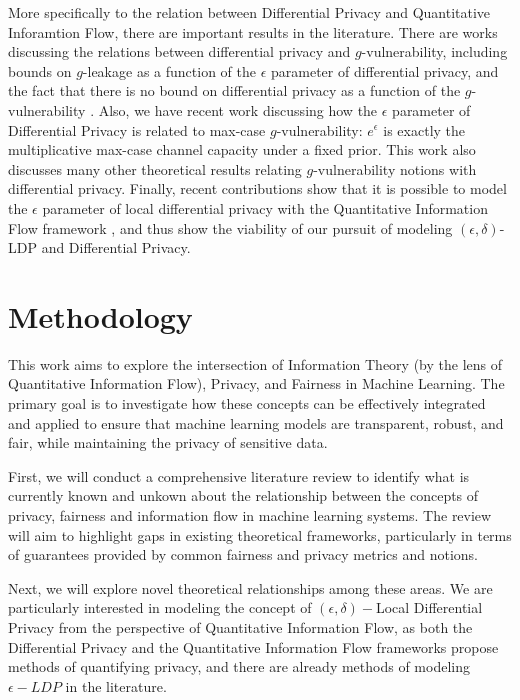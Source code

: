 \documentclass[12pt]{article}
\begin{document}
More specifically to the relation between Differential Privacy and Quantitative Inforamtion Flow, there are important results in the literature. There are works discussing the relations between differential privacy and $g$-vulnerability, including bounds on $g$-leakage as a function of the $\epsilon$ parameter of differential privacy, and the fact that there is no bound on differential privacy as a function of the $g$-vulnerability \cite{alvim2015information}. Also, we have recent work \cite{fernandes2022explaining} discussing how the $\epsilon$ parameter of Differential Privacy is related to max-case $g$-vulnerability: $e^\epsilon$ is exactly the multiplicative max-case channel capacity under a fixed prior. This work also discusses many other theoretical results relating $g$-vulnerability notions with differential privacy. Finally, recent contributions show that it is possible to model the $\epsilon$ parameter of local differential privacy with the Quantitative Information Flow framework \cite{fernandes2024explaining}, and thus show the viability of our pursuit of modeling $(\epsilon,\delta)$-LDP and Differential Privacy.

\vspace{-1em}
\section{Methodology}

This work aims to explore the intersection of Information Theory (by the lens of Quantitative Information Flow), Privacy, and Fairness in Machine Learning. The primary goal is to investigate how these concepts can be effectively integrated and applied to ensure that machine learning models are transparent, robust, and fair, while maintaining the privacy of sensitive data.

First, we will conduct a comprehensive literature review to identify what is currently known and unkown about the relationship between the concepts of privacy, fairness and information flow in machine learning systems. The review will aim to highlight gaps in existing theoretical frameworks, particularly in terms of guarantees provided by common fairness and privacy metrics and notions.

Next, we will explore novel theoretical relationships among these areas. We are particularly interested in modeling the concept of $(\epsilon,\delta)-$Local Differential Privacy from the perspective of Quantitative Information Flow, as both the Differential Privacy and the Quantitative Information Flow frameworks propose methods of quantifying privacy, and there are already methods of modeling $\epsilon-LDP$ in the literature\cite{fernandes2022explaining}. 
\end{document}
